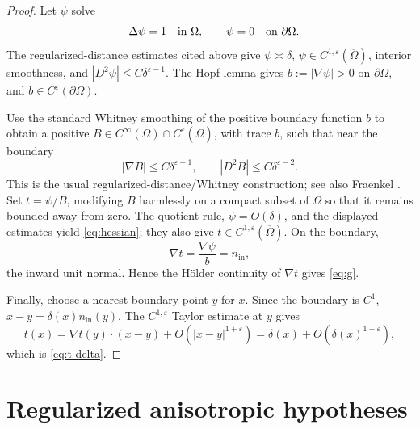 \documentclass[11pt]{article}
\newcommand{\Om}{\Omega}
\newcommand{\Grad}{\nabla}
\newcommand{\eps}{\varepsilon}
\begin{document}
\begin{proof}
Let \(\psi\) solve
\[
-\Delta\psi=1\quad\hbox{in }\Om,\qquad \psi=0
\quad\hbox{on }\partial\Om .
\]
The regularized-distance estimates cited above give
\(\psi\asymp\delta\), \(\psi\in C^{1,\eps}(\overline\Om)\), interior
smoothness, and
\(|D^2\psi|\leq C\delta^{\eps-1}\).  The Hopf lemma gives
\(b:=|\Grad\psi|>0\) on \(\partial\Om\), and
\(b\in C^\eps(\partial\Om)\).

Use the standard Whitney smoothing of the positive boundary function \(b\)
to obtain a positive \(B\in C^\infty(\Om)\cap
C^\eps(\overline\Om)\), with trace \(b\), such that near the boundary
\[
|\Grad B|\leq C\delta^{\eps-1},\qquad
|D^2B|\leq C\delta^{\eps-2}.
\]
This is the usual regularized-distance/Whitney construction; see also
Fraenkel \cite{Fraenkel}.  Set \(t=\psi/B\), modifying \(B\) harmlessly on
a compact subset of \(\Om\) so that it remains bounded away from zero.
The quotient rule, \(\psi=O(\delta)\), and the displayed estimates yield
\eqref{eq:hessian}; they also give \(t\in
C^{1,\eps}(\overline\Om)\).  On the boundary,
\[
\Grad t=\frac{\Grad\psi}{b}=n_{\mathrm{in}},
\]
the inward unit normal.  Hence the Hölder continuity of \(\Grad t\) gives
\eqref{eq:g}.

Finally, choose a nearest boundary point \(y\) for \(x\).  Since the boundary
is \(C^1\), \(x-y=\delta(x)n_{\mathrm{in}}(y)\).  The
\(C^{1,\eps}\) Taylor estimate at \(y\) gives
\[
t(x)=\Grad t(y)\cdot(x-y)+O(|x-y|^{1+\eps})
=\delta(x)+O(\delta(x)^{1+\eps}),
\]
which is \eqref{eq:t-delta}.
\end{proof}

\section{Regularized anisotropic hypotheses}
\end{document}
